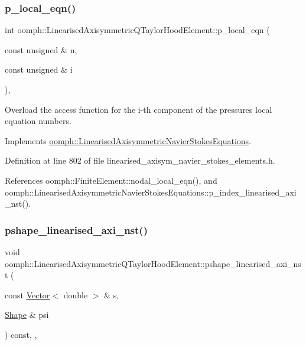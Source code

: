 \subsubsection{\texorpdfstring{p\+\_\+local\+\_\+eqn()}{p\_local\_eqn()}}
{\footnotesize\ttfamily int oomph\+::\+Linearised\+Axisymmetric\+Q\+Taylor\+Hood\+Element\+::p\+\_\+local\+\_\+eqn (\begin{DoxyParamCaption}\item[{const unsigned \&}]{n,  }\item[{const unsigned \&}]{i }\end{DoxyParamCaption})\hspace{0.3cm}{\ttfamily [inline]}, {\ttfamily [virtual]}}



Overload the access function for the i-\/th component of the pressure\textquotesingle{}s local equation numbers. 



Implements \hyperlink{classoomph_1_1LinearisedAxisymmetricNavierStokesEquations_a78d4ea2b8f4d23f8e942dc7bcb3fa4c5}{oomph\+::\+Linearised\+Axisymmetric\+Navier\+Stokes\+Equations}.



Definition at line 802 of file linearised\+\_\+axisym\+\_\+navier\+\_\+stokes\+\_\+elements.\+h.



References oomph\+::\+Finite\+Element\+::nodal\+\_\+local\+\_\+eqn(), and oomph\+::\+Linearised\+Axisymmetric\+Navier\+Stokes\+Equations\+::p\+\_\+index\+\_\+linearised\+\_\+axi\+\_\+nst().

\mbox{\label{classoomph_1_1LinearisedAxisymmetricQTaylorHoodElement_a48fa05d60b707ef51decf0fb829ed8ee}} 
\subsubsection{\texorpdfstring{pshape\+\_\+linearised\+\_\+axi\+\_\+nst()}{pshape\_linearised\_axi\_nst()}\hspace{0.1cm}{\footnotesize\ttfamily [1/2]}}
{\footnotesize\ttfamily void oomph\+::\+Linearised\+Axisymmetric\+Q\+Taylor\+Hood\+Element\+::pshape\+\_\+linearised\+\_\+axi\+\_\+nst (\begin{DoxyParamCaption}\item[{const \hyperlink{classoomph_1_1Vector}{Vector}$<$ double $>$ \&}]{s,  }\item[{\hyperlink{classoomph_1_1Shape}{Shape} \&}]{psi }\end{DoxyParamCaption}) const\hspace{0.3cm}{\ttfamily [inline]}, {\ttfamily [protected]}, {\ttfamily [virtual]}}



